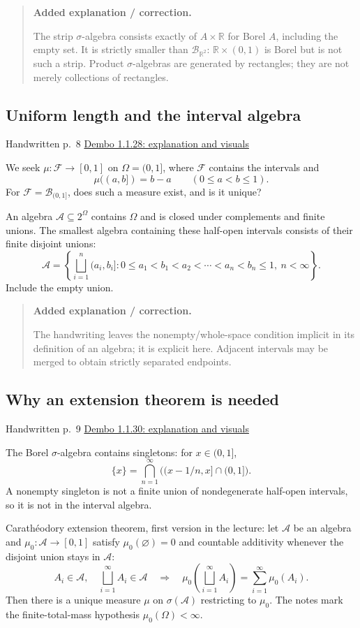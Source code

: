 \documentclass[11pt,letterpaper]{article}
\newcommand{\lecturesection}[1]{\subsection{#1}}
\begin{document}
\begin{quote}\small\textbf{Added explanation / correction.}

The strip $\sigma$-algebra consists exactly of $A\times\mathbb R$ for Borel $A$, including the empty set. It is strictly smaller than $\mathcal B_{\mathbb R^2}$: $\mathbb R\times(0,1)$ is Borel but is not such a strip. Product $\sigma$-algebras are generated by rectangles; they are not merely collections of rectangles.
\end{quote}

\hypertarget{l1-s8}{}
\lecturesection{Uniform length and the interval algebra}
{\small\textcolor{lectureink}{Handwritten p.\ 8} \quad \href{https://josephrbailey.com/probability/\#entry-1-1-28}{Dembo 1.1.28: explanation and visuals}}

We seek $\mu:\mathcal F\to[0,1]$ on $\Omega=(0,1]$, where $\mathcal F$ contains the intervals and \[\mu((a,b])=b-a\qquad(0\le a<b\le1).\] For $\mathcal F=\mathcal B_{(0,1]}$, does such a measure exist, and is it unique?

An algebra $\mathcal A\subseteq2^\Omega$ contains $\Omega$ and is closed under complements and finite unions. The smallest algebra containing these half-open intervals consists of their finite disjoint unions: \[\mathcal A=\left\{\bigsqcup_{i=1}^n(a_i,b_i]:0\le a_1<b_1<a_2<\cdots<a_n<b_n\le1,\ n<\infty\right\}.\] Include the empty union.

\begin{quote}\small\textbf{Added explanation / correction.}

The handwriting leaves the nonempty/whole-space condition implicit in its definition of an algebra; it is explicit here. Adjacent intervals may be merged to obtain strictly separated endpoints.
\end{quote}

\hypertarget{l1-s9}{}
\lecturesection{Why an extension theorem is needed}
{\small\textcolor{lectureink}{Handwritten p.\ 9} \quad \href{https://josephrbailey.com/probability/\#entry-1-1-30}{Dembo 1.1.30: explanation and visuals}}

The Borel $\sigma$-algebra contains singletons: for $x\in(0,1]$, \[\{x\}=\bigcap_{n=1}^{\infty}\bigl((x-1/n,x]\cap(0,1]\bigr).\] A nonempty singleton is not a finite union of nondegenerate half-open intervals, so it is not in the interval algebra.

Carathéodory extension theorem, first version in the lecture: let $\mathcal A$ be an algebra and $\mu_0:\mathcal A\to[0,1]$ satisfy $\mu_0(\varnothing)=0$ and countable additivity whenever the disjoint union stays in $\mathcal A$: \[A_i\in\mathcal A,\quad\bigsqcup_{i=1}^{\infty}A_i\in\mathcal A\quad\Longrightarrow\quad\mu_0\!\left(\bigsqcup_{i=1}^{\infty}A_i\right)=\sum_{i=1}^{\infty}\mu_0(A_i).\] Then there is a unique measure $\mu$ on $\sigma(\mathcal A)$ restricting to $\mu_0$. The notes mark the finite-total-mass hypothesis $\mu_0(\Omega)<\infty$.
\end{document}
